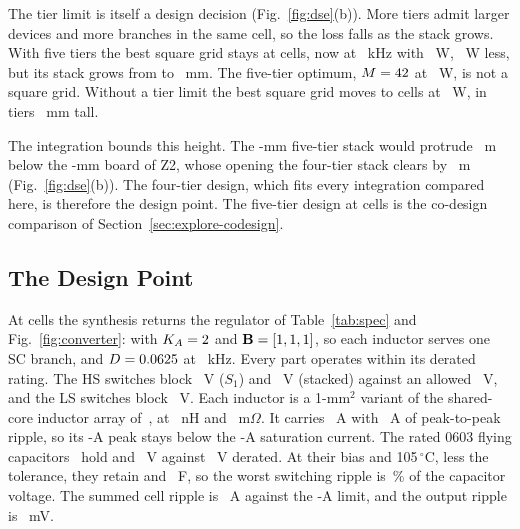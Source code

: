 The tier limit is itself a design decision (Fig.~\ref{fig:dse}(b)). More tiers admit larger devices
and more branches in the same cell, so the loss falls as the stack grows. With five tiers the best
square grid stays at \FrDseTfiveSqM{} cells, now \FrDseTfiveSqTopo{} at \FrDseTfiveSqFsw~kHz with
\FrDseTfiveSqLoss~W, \FrDseTfiveSqGain~W less, but its stack grows from \FrDseOptStack{} to
\FrDseTfiveSqStack~mm. The five-tier optimum, $M = 42$ at \FrDseTfiveOptLoss~W, is not
a square grid. Without a tier limit the best square grid moves to \FrDseTinfSqM{} cells at
\FrDseTinfSqLoss~W, in \FrDseTinfSqTiersWord{} tiers \FrDseTinfSqStack~mm tall.

The integration bounds this height. The \FrDseTfiveSqStack-mm five-tier stack would protrude
\FrProtrudeTfive~\textmu m below the \FrBoardMm-mm board of Z2, whose opening the four-tier stack
clears by \FrFitThirtysix~\textmu m (Fig.~\ref{fig:dse}(b)). The four-tier design, which fits every
integration compared here, is therefore the design point. The five-tier design at
\FrDseTfiveSqM{} cells is the co-design comparison of Section~\ref{sec:explore-codesign}.

\subsection{The Design Point}\label{sec:dse-point}
At \FrDseOptM{} cells the synthesis returns the regulator of Table~\ref{tab:spec} and
Fig.~\ref{fig:converter}: \FrConvTopo{} with $K_A = 2$ and $\mathbf{B} = [1, 1, 1]$, so
each inductor serves one SC branch, and $D = 0.0625$ at \FrConvFsw~kHz. Every part operates
within its derated rating. The \FrConvHsPart{} HS switches block \FrConvHsVsone~V ($S_1$) and
\FrConvHsVstack~V (stacked) against an allowed \FrConvSwVallow~V, and the \FrConvLsPart{} LS
switches block \FrConvLsVs~V. Each inductor is a 1-mm$^2$ variant of the shared-core inductor array
of~\cite{Rasheedi2026CoupledInductor}, at \FrConvIndL~nH and \FrConvIndDcr~m$\Omega$. It carries
\FrConvIndIavg~A with \FrConvIndRipple~A of peak-to-peak ripple, so its \FrConvIndIpk-A peak stays
below the \FrConvIndIsat-A saturation current. The rated 0603 flying
capacitors~\cite{FrMurataGRM188} hold \FrConvCapVone{} and \FrConvCapVtwo~V against
\FrConvCapVallow~V derated. At their bias and 105\,$^\circ$C, less the tolerance, they retain
\FrConvCapCeffHotOne{} and \FrConvCapCeffHotTwo~\textmu F, so the worst switching ripple is
\FrConvCapRipple\,\% of the capacitor voltage. The summed cell ripple is \FrConvOutRipple~A against
the \FrConvOutRippleLim-A limit, and the output ripple is \FrConvVripple~mV.

